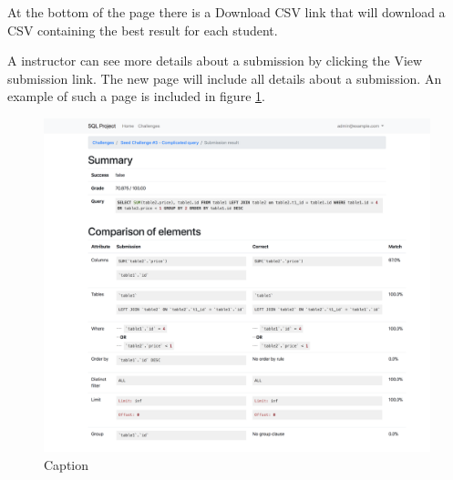 At the bottom of the page there is a Download CSV link that will download a CSV containing the best result for each student.

A instructor can see more details about a submission by clicking the View submission link. The new page will include all details about a submission. An example of such a page is included in figure \ref{fig:app:submission_report}.

\begin{figure}
    \centering
    \includegraphics[width=\textwidth/4*3]{Appendices/submission_report.png}
    \caption{Caption}
    \label{fig:app:submission_report}
\end{figure}
